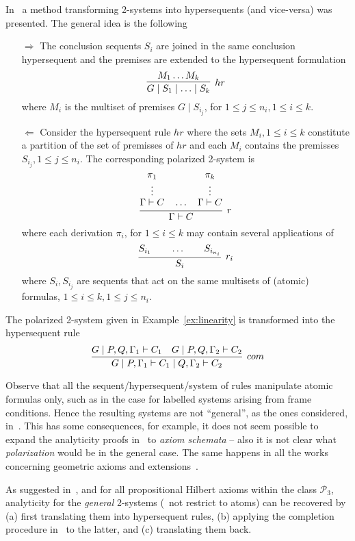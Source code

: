 
In~\cite{DBLP:journals/tocl/CiabattoniG18} a method transforming 2-systems into hypersequents (and vice-versa) was presented. The general idea is the following
\begin{itemize}
\item[$\Rightarrow$] The conclusion sequents $S_i$ are joined in the same conclusion hypersequent and the premises are extended to the hypersequent formulation
\[
\infer[hr]{G\mid S_1\mid \ldots \mid S_k}
{M_1 \ldots M_k}
\]
where $M_i$ is the multiset of premises $G\mid S_{i_j}$, for $1\leq j\leq n_i, 1\leq i\leq k$.
\item[$\Leftarrow$] Consider the hypersequent rule $hr$ where the sets $M_i, 1 \leq i \leq k$ constitute a partition of the set of premisses of $hr$ and each $M_i$ contains the premisses $S_{i_j}, 1\leq j\leq n_i$. The corresponding polarized 2-system is
\[
\infer[r]{\Gamma\vdash C}
      {\deduce{\Gamma\vdash C\strut}
              {\deduce{\vdots}
                      {\pi_1}}\quad\ldots\quad
       \deduce{\Gamma\vdash C\strut}
              {\deduce{\vdots}
                      {\pi_k}}}
\]
where each derivation $\pi_i$, for $1\leq i \leq k$ may contain several applications of
\[
\infer[r_i]{S_i}
{S_{i_1}\qquad\ldots\qquad S_{i_{n_i}}}
\]
where $S_i,S_{i_j}$ are sequents that act on the same multisets of (atomic) formulas, $1\leq i\leq k, 1\leq j\leq n_i$. %
\end{itemize}
\begin{example}
The polarized 2-system given in Example~\ref{ex:linearity} is transformed 
into the hypersequent rule
\[
\infer[com]{G\mid P,\Gamma_1\vdash C_1\mid Q,\Gamma_2\vdash C_2}
{G\mid P,Q,\Gamma_1\vdash C_1 & G\mid  P,Q,\Gamma_2\vdash C_2}
\]
\end{example}
Observe that all the sequent/hypersequent/system of rules manipulate atomic formulas only, such as in the case for labelled systems arising from frame conditions. Hence the resulting systems are not ``general'', as the ones considered, \eg in~\cite{DBLP:conf/lics/CiabattoniGT08}. This has some consequences, for example, it does not seem possible to expand the analyticity proofs in~\cite{DBLP:journals/apal/MarinMPV22} to {\em axiom schemata} -- also it is not clear what {\em polarization} would be in the general case. The same happens in all the works concerning geometric axioms and extensions~\cite{NegVPl98,Neg03,Neg16,negri19}.

As suggested in~\cite{DBLP:journals/tocl/CiabattoniG18}, and for all propositional Hilbert axioms within the class $\mathcal{P}_3$, analyticity for the {\em general} 2-systems (\ie\ not restrict to atoms) can be recovered by (a) first translating them into hypersequent rules, (b) applying the completion procedure in~\cite{DBLP:conf/lics/CiabattoniGT08} to the latter, and (c) translating them back. 



